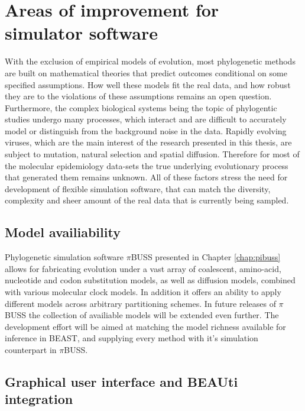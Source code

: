 \section{Areas of improvement for {\bussname} simulator software}

With the exclusion of empirical models of evolution, most phylogenetic methods are built on mathematical theories that predict outcomes conditional on some specified assumptions.
How well these models fit the real data, and how robust they are to the violations of these assumptions remains an open question.
Furthermore, the complex biological systems being the topic of phylogentic studies undergo many processes, which interact and are difficult to accurately model or distinguish from the background noise in the data.
Rapidly evolving viruses, which are the main interest of the research presented in this thesis, are subject to mutation, natural selection and spatial diffusion.
Therefore for most of the molecular epidemiology data-sets the true underlying evolutionary process that generated them remains unknown.
All of these factors stress the need for development of flexible simulation software, that can match the diversity, complexity and sheer amount of the real data that is currently being sampled.

\subsection{Model availiability}

Phylogenetic simulation software $\pi$BUSS presented in Chapter \ref{chap:pibuss} allows for fabricating evolution under a vast array of coalescent, amino-acid, nucleotide and codon substitution models, as well as diffusion models, combined with various molecular clock models.
In addition it offers an ability to apply different models across arbitrary partitioning schemes.
In future releases of $\pi$BUSS the collection of availiable models will be extended even further.
The development effort will be aimed at matching the model richness available for inference in BEAST, and supplying every method with it's simulation counterpart in $\pi$BUSS.


\subsection{Graphical user interface and BEAUti integration}

